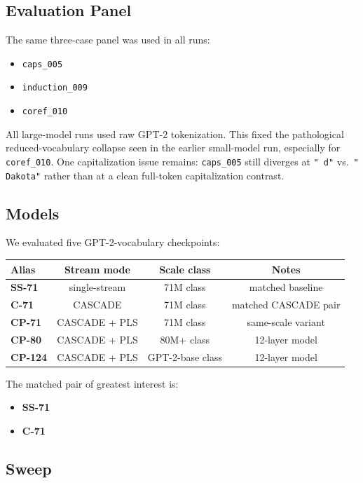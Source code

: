 \documentclass[11pt]{article}
\begin{document}
\subsection{Evaluation Panel}

The same three-case panel was used in all runs:
\begin{itemize}[leftmargin=1.5em]
\item \texttt{caps\_005}
\item \texttt{induction\_009}
\item \texttt{coref\_010}
\end{itemize}

All large-model runs used raw GPT-2 tokenization. This fixed the pathological
reduced-vocabulary collapse seen in the earlier small-model run, especially for
\texttt{coref\_010}. One capitalization issue remains: \texttt{caps\_005}
still diverges at \texttt{" d"} vs.\ \texttt{" Dakota"} rather than at a clean
full-token capitalization contrast.

\subsection{Models}

We evaluated five GPT-2-vocabulary checkpoints:

\begin{center}
\begin{tabular}{lccc}
\toprule
Alias & Stream mode & Scale class & Notes \\
\midrule
\textbf{SS-71} & single-stream & 71M class & matched baseline \\
\textbf{C-71} & CASCADE & 71M class & matched CASCADE pair \\
\textbf{CP-71} & CASCADE + PLS & 71M class & same-scale variant \\
\textbf{CP-80} & CASCADE + PLS & 80M+ class & 12-layer model \\
\textbf{CP-124} & CASCADE + PLS & GPT-2-base class & 12-layer model \\
\bottomrule
\end{tabular}
\end{center}

The matched pair of greatest interest is:
\begin{itemize}[leftmargin=1.5em]
\item \textbf{SS-71}
\item \textbf{C-71}
\end{itemize}

\subsection{Sweep}
\end{document}
